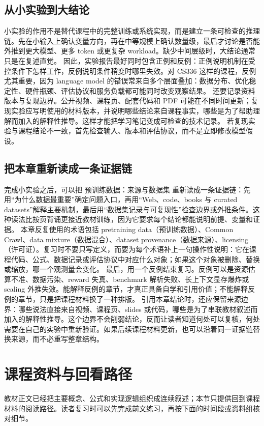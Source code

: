 \documentclass[a4paper]{article}
\begin{document}
\subsection{从小实验到大结论}
小实验的作用不是替代课程中的完整训练或系统实现，而是建立一条可检查的推理链。先在小输入上确认变量方向，再在中等规模上确认数量级，最后才讨论是否能外推到更大模型、更多 token 或更复杂 workload。缺少中间层级时，大结论通常只是在复述直觉。
因此，实验报告最好同时包含正例和反例：正例说明机制在受控条件下怎样工作，反例说明条件稍变时哪里失效。对 CS336 这样的课程，反例尤其重要，因为 language model 的错误常来自多个层面叠加：数据分布、优化稳定性、硬件瓶颈、评估协议和服务负载都可能同时改变观察结果。
还要记录资料版本与复现边界。公开视频、课程页、配套代码和 PDF 可能在不同时间更新；复现实验应写明使用的材料版本，并说明哪些结论来自课程事实，哪些是为了帮助理解而加入的解释性推导。这样才能把学习笔记变成可检查的技术记录。
若复现实验与课程结论不一致，首先检查输入、版本和评估协议，而不是立即修改模型假设。
\subsection{把本章重新读成一条证据链}
完成小实验之后，可以把 预训练数据：来源与数据集 重新读成一条证据链：先用“为什么数据最重要”确定问题入口，再用“Web、code、books 与 curated datasets”解释主要机制，最后用“数据集记录与可复现性”检查边界或外推条件。这种读法比按页背诵更接近教材训练，因为它要求每个结论都能说明前提、变量和证据。
本章反复使用的术语包括 pretraining data（预训练数据）、Common Crawl、data mixture（数据混合）、dataset provenance（数据来源）、licensing（许可证）。复习时不要只写定义，而要为每个术语补上一句操作性说明：它在课程代码、公式、数据记录或评估协议中对应什么对象；如果这个对象被删除、替换或缩放，哪一个观测量会变化。
最后，用一个反例结束复习。反例可以是资源估算不准、数据污染、reward 失真、benchmark 解析失败、长上下文显存爆炸或 scaling 外推失效。能解释反例的章节，才真正具备自学和引用价值；不能解释反例的章节，只是把课程材料换了一种排版。
引用本章结论时，还应保留来源边界：哪些说法直接来自视频、课程页、slides 或代码，哪些是为了串联教材叙述而加入的解释性推导。这个边界不会削弱结论，反而让读者知道何处可以复核，何处需要在自己的实验中重新验证。如果后续课程材料更新，也可以沿着同一证据链替换来源，而不必重写整章结构。
\section{课程资料与回看路径}
教材正文已经把主要概念、公式和实现逻辑组织成连续叙述；本节只提供回到课程材料的阅读路径。读者复习时可以先完成前文练习，再按下面的时间段或资料组核对细节。
\end{document}
